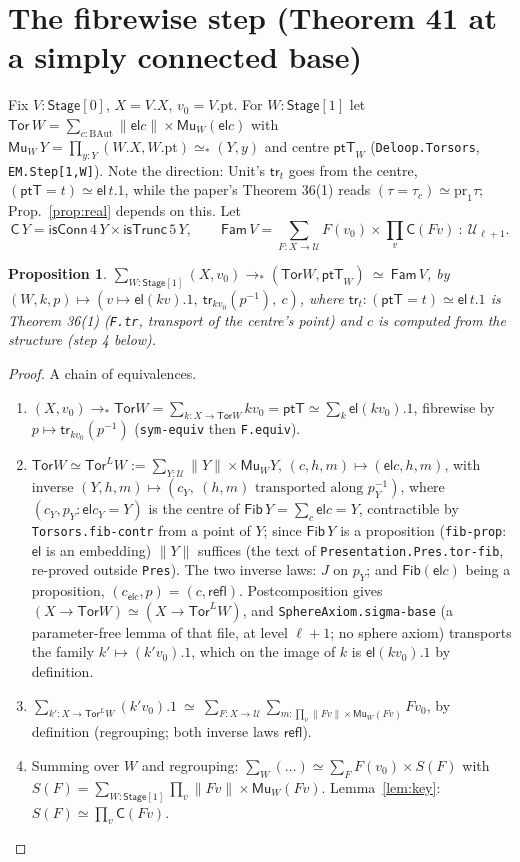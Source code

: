 \documentclass[11pt]{amsart}
\newtheorem{proposition}[theorem]{Proposition}
\theoremstyle{definition}
\theoremstyle{remark}
\newcommand{\code}[1]{\texttt{#1}}
\newcommand{\cT}{\mathsf{isTrunc}}
\newcommand{\cC}{\mathsf{isConn}}
\newcommand{\refl}{\mathsf{refl}}
\newcommand{\el}{\mathsf{el}}
\newcommand{\tr}[1]{\|#1\|}
\newcommand{\St}{\mathsf{Stage}}
\newcommand{\Tor}{\mathsf{Tor}}
\newcommand{\Fam}{\mathsf{Fam}}
\newcommand{\Mu}{\mathsf{Mu}}
\newcommand{\pteq}{\simeq_*}
\newcommand{\U}{\mathcal{U}}
\begin{document}
\section{The fibrewise step (Theorem 41 at a simply connected base)}

Fix $V:\St[0]$, $X=V.X$, $v_0=V.\mathrm{pt}$. For $W:\St[1]$ let
$\Tor\,W=\sum_{c:\mathrm{BAut}}\tr{\el c}\times\Mu_W(\el c)$ with $\Mu_W\,Y=\prod_{y:Y}(W.X,W.\mathrm{pt})\pteq(Y,y)$
and centre $\mathsf{ptT}_W$ (\code{Deloop.Torsors}, \code{EM.Step[1,W]}). Note the direction: Unit's $\mathsf{tr}_t$ goes
from the centre, $(\mathsf{ptT}=t)\simeq\el\,t.1$, while the paper's Theorem 36(1) reads
$(\tau=\tau_c)\simeq\mathrm{pr}_1\tau$; Prop.~\ref{prop:real} depends on this. Let
\[\textstyle \mathsf{C}\,Y=\cC\,4\,Y\times\cT\,5\,Y,\qquad \Fam\,V=\sum_{F:X\to\U}F(v_0)\times\prod_v\mathsf{C}(F v)\ :\ \U_{\ell+1}.\]

\begin{proposition}\label{prop:fib}
$\sum_{W:\St[1]}(X,v_0)\to_*(\Tor W,\mathsf{ptT}_W)\ \simeq\ \Fam\,V$, by
$(W,k,p)\mapsto(v\mapsto\el(k v).1,\ \mathsf{tr}_{k v_0}(p^{-1}),\ c)$, where
$\mathsf{tr}_t:(\mathsf{ptT}=t)\simeq\el\,t.1$ is Theorem 36(1) (\code{F.tr}, transport of the centre's point)
and $c$ is computed from the structure (step 4 below).
\end{proposition}
\begin{proof} A chain of equivalences.
\begin{enumerate}
\item $(X,v_0)\to_*\Tor W=\sum_{k:X\to\Tor W}k v_0=\mathsf{ptT}\simeq\sum_k\el(k v_0).1$, fibrewise by
$p\mapsto\mathsf{tr}_{k v_0}(p^{-1})$ (\code{sym-equiv} then \code{F.equiv}).
\item $\Tor W\simeq\Tor^L W:=\sum_{Y:\U}\tr Y\times\Mu_W Y$, $(c,h,m)\mapsto(\el c,h,m)$, with
inverse $(Y,h,m)\mapsto(c_Y,\ (h,m)\text{ transported along }p_Y^{-1})$, where
$(c_Y,p_Y:\el c_Y=Y)$ is the centre of $\mathsf{Fib}\,Y=\sum_c\el c=Y$, contractible by
\code{Torsors.fib-contr} from a point of $Y$; since $\mathsf{Fib}\,Y$ is a proposition
(\code{fib-prop}: $\el$ is an embedding) $\tr Y$ suffices (the text of
\code{Presentation.Pres.tor-fib}, re-proved outside \code{Pres}). The two inverse laws: $J$ on
$p_Y$; and $\mathsf{Fib}(\el c)$ being a proposition, $(c_{\el c},p)=(c,\refl)$. Postcomposition gives
$(X\to\Tor W)\simeq(X\to\Tor^LW)$, and \code{SphereAxiom.sigma-base} (a parameter-free lemma of
that file, at level $\ell{+}1$; no sphere axiom) transports the family
$k'\mapsto(k'v_0).1$, which on the image of $k$ is $\el(kv_0).1$ by definition.
\item $\sum_{k':X\to\Tor^LW}(k'v_0).1\ \simeq\ \sum_{F:X\to\U}\sum_{m:\prod_v\tr{Fv}\times\Mu_W(Fv)}F v_0$, by definition
(regrouping; both inverse laws $\refl$).
\item Summing over $W$ and regrouping:
$\sum_W(\ldots)\simeq\sum_F F(v_0)\times S(F)$ with $S(F)=\sum_{W:\St[1]}\prod_v\tr{Fv}\times\Mu_W(Fv)$.
Lemma~\ref{lem:key}: $S(F)\simeq\prod_v\mathsf{C}(Fv)$.
\end{enumerate}\end{proof}
\end{document}
